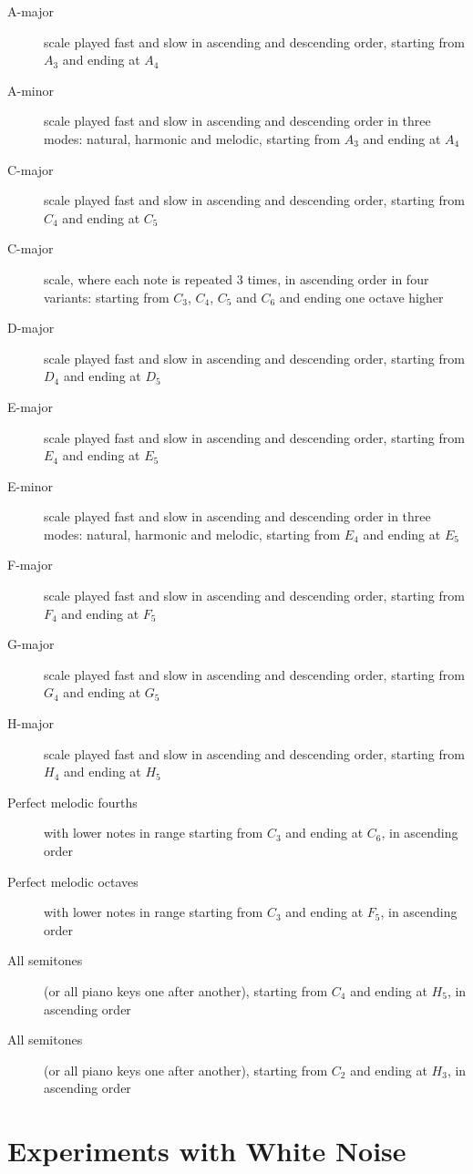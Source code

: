 \begin{description}
	\item[A-major] scale played fast and slow in ascending and descending order, starting from $A_3$ and ending at $A_4$
	\item[A-minor] scale played fast and slow in ascending and descending order in three modes: natural, harmonic and melodic, starting from $A_3$ and ending at $A_4$
	\item[C-major] scale played fast and slow in ascending and descending order, starting from $C_4$ and ending at $C_5$
	\item[C-major] scale, where each note is repeated 3 times, in ascending order in four variants: starting from $C_3$, $C_4$, $C_5$ and $C_6$ and ending one octave higher
	\item[D-major] scale played fast and slow in ascending and descending order, starting from $D_4$ and ending at $D_5$
	\item[E-major] scale played fast and slow in ascending and descending order, starting from $E_4$ and ending at $E_5$
	\item[E-minor] scale played fast and slow in ascending and descending order in three modes: natural, harmonic and melodic, starting from $E_4$ and ending at $E_5$
	\item[F-major] scale played fast and slow in ascending and descending order, starting from $F_4$ and ending at $F_5$
	\item[G-major] scale played fast and slow in ascending and descending order, starting from $G_4$ and ending at $G_5$
	\item[H-major] scale played fast and slow in ascending and descending order, starting from $H_4$ and ending at $H_5$
	\item[Perfect melodic fourths] with lower notes in range starting from $C_3$ and ending at $C_6$, in ascending order
	\item[Perfect melodic octaves] with lower notes in range starting from $C_3$ and ending at $F_5$, in ascending order
	\item[All semitones] (or all piano keys one after another), starting from $C_4$ and ending at $H_5$, in ascending order
	\item[All semitones] (or all piano keys one after another), starting from $C_2$ and ending at $H_3$, in ascending order
\end{description}

\section{Experiments with White Noise}

